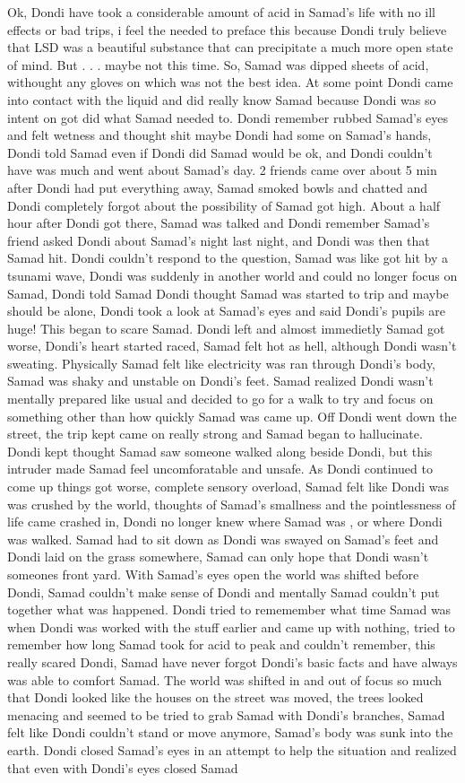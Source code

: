 \documentclass[12pt]{book}
\begin{document}
Ok, Dondi have took a considerable amount of acid in Samad's life with no ill effects or bad trips, i feel the needed to preface this because Dondi truly believe that LSD was a beautiful substance that can precipitate a much more open state of mind. But . . .  maybe not this time. So, Samad was dipped sheets of acid, withought any gloves on which was not the best idea. At some point Dondi came into contact with the liquid and did really know Samad because Dondi was so intent on got did what Samad needed to. Dondi remember rubbed Samad's eyes and felt wetness and thought shit maybe Dondi had some on Samad's hands, Dondi told Samad even if Dondi did Samad would be ok, and Dondi couldn't have was much and went about Samad's day. 2 friends came over about 5 min after Dondi had put everything away, Samad smoked bowls and chatted and Dondi completely forgot about the possibility of Samad got high. About a half hour after Dondi got there, Samad was talked and Dondi remember Samad's friend asked Dondi about Samad's night last night, and Dondi was then that Samad hit. Dondi couldn't respond to the question, Samad was like got hit by a tsunami wave, Dondi was suddenly in another world and could no longer focus on Samad, Dondi told Samad Dondi thought Samad was started to trip and maybe should be alone, Dondi took a look at Samad's eyes and said Dondi's pupils are huge! This began to scare Samad. Dondi left and almost immedietly Samad got worse, Dondi's heart started raced, Samad felt hot as hell, although Dondi wasn't sweating. Physically Samad felt like electricity was ran through Dondi's body, Samad was shaky and unstable on Dondi's feet. Samad realized Dondi wasn't mentally prepared like usual and decided to go for a walk to try and focus on something other than how quickly Samad was came up. Off Dondi went down the street, the trip kept came on really strong and Samad began to hallucinate. Dondi kept thought Samad saw someone walked along beside Dondi, but this intruder made Samad feel uncomforatable and unsafe. As Dondi continued to come up things got worse, complete sensory overload, Samad felt like Dondi was was crushed by the world, thoughts of Samad's smallness and the pointlessness of life came crashed in, Dondi no longer knew where Samad was , or where Dondi was walked. Samad had to sit down as Dondi was swayed on Samad's feet and Dondi laid on the grass somewhere, Samad can only hope that Dondi wasn't someones front yard. With Samad's eyes open the world was shifted before Dondi, Samad couldn't make sense of Dondi and mentally Samad couldn't put together what was happened. Dondi tried to rememember what time Samad was when Dondi was worked with the stuff earlier and came up with nothing, tried to remember how long Samad took for acid to peak and couldn't remember, this really scared Dondi, Samad have never forgot Dondi's basic facts and have always was able to comfort Samad. The world was shifted in and out of focus so much that Dondi looked like the houses on the street was moved, the trees looked menacing and seemed to be tried to grab Samad with Dondi's branches, Samad felt like Dondi couldn't stand or move anymore, Samad's body was sunk into the earth. Dondi closed Samad's eyes in an attempt to help the situation and realized that even with Dondi's eyes closed Samad 
\end{document}
